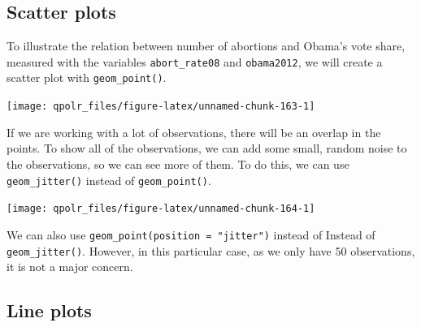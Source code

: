 \documentclass[12pt,oneside]{reedthesis}
\theoremstyle{definition}
\theoremstyle{definition}
\theoremstyle{definition}
\theoremstyle{remark}
\begin{document}
  \subsection{Scatter plots}\label{scatter-plots}
  
  To illustrate the relation between number of abortions and Obama's vote
  share, measured with the variables \texttt{abort\_rate08} and
  \texttt{obama2012}, we will create a scatter plot with
  \texttt{geom\_point()}.
  \begin{Shaded}
  \begin{Highlighting}[]
  \NormalTok{(}\OperatorTok{+}
  \StringTok{  }\NormalTok{() }
  \end{Highlighting}
  \end{Shaded}
  \begin{center}\texttt{[image: qpolr\_files/figure-latex/unnamed-chunk-163-1]} \end{center}
  
  If we are working with a lot of observations, there will be an overlap
  in the points. To show all of the observations, we can add some small,
  random noise to the observations, so we can see more of them. To do
  this, we can use \texttt{geom\_jitter()} instead of
  \texttt{geom\_point()}.
  \begin{Shaded}
  \begin{Highlighting}[]
  \NormalTok{(}\OperatorTok{+}
  \StringTok{  }\NormalTok{() }
  \end{Highlighting}
  \end{Shaded}
  \begin{center}\texttt{[image: qpolr\_files/figure-latex/unnamed-chunk-164-1]} \end{center}
  
  We can also use \texttt{geom\_point(position\ =\ "jitter")} instead of
  Instead of \texttt{geom\_jitter()}. However, in this particular case, as
  we only have 50 observations, it is not a major concern.
  
  \subsection{Line plots}\label{line-plots}
  
\end{document}
